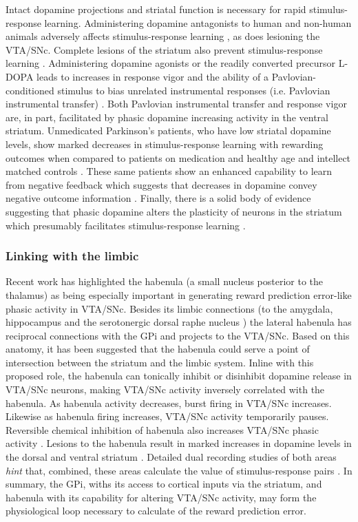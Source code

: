 \documentclass[doc,12pt]{apa}        %
\begin{document}
Intact dopamine projections and striatal function is necessary for rapid stimulus-response learning.  Administering dopamine antagonists to human and non-human animals adversely affects stimulus-response learning \cite{Pizzagalli:2010p7205}, as does lesioning the VTA/SNc.  Complete lesions of the striatum also prevent stimulus-response learning \cite{Packard:2002p5074}.  Administering dopamine agonists or the readily converted precursor L-DOPA leads to increases in response vigor and the ability of a Pavlovian-conditioned stimulus to bias unrelated instrumental responses (i.e. Pavlovian instrumental transfer) \cite{Winterbauer:2007p6352}. Both Pavlovian instrumental transfer and response vigor are, in part, facilitated by phasic dopamine increasing activity in the ventral striatum.  Unmedicated Parkinson's patients, who have low striatal dopamine levels, show marked decreases in stimulus-response learning with rewarding outcomes when compared to patients on medication and healthy age and intellect matched controls \cite{Pizzagalli:2010p7205}.  These same patients show an enhanced capability to learn from negative feedback which suggests that decreases in dopamine convey negative outcome information \cite{Frank:2004p4709}.  Finally, there is a solid body of evidence suggesting that phasic dopamine alters the plasticity of neurons in the striatum which presumably facilitates stimulus-response learning \cite{Calabresi:2007p4284}.

\subsubsection{Linking with the limbic}
\label{subsub:limbic}
Recent work has highlighted the habenula (a small nucleus posterior to the thalamus) as being especially important in generating reward prediction error-like phasic activity in VTA/SNc.  Besides its limbic connections (to the amygdala, hippocampus and the serotonergic dorsal raphe nucleus \cite{Hikosaka:2008p4455}) the lateral habenula has reciprocal connections with the GPi and projects to the VTA/SNc.  Based on this anatomy, it has been suggested that the habenula could serve a point of intersection between the striatum and the limbic system.  Inline with this proposed role, the habenula can tonically inhibit or disinhibit dopamine release in VTA/SNc neurons, making VTA/SNc activity inversely correlated with the habenula.  As habenula activity decreases, burst firing in VTA/SNc increases.  Likewise as habenula firing increases, VTA/SNc activity temporarily pauses.  Reversible chemical inhibition of habenula also increases VTA/SNc phasic activity \cite{Hikosaka:2008p4455}.  Lesions to the habenula result in marked increases in dopamine levels in the dorsal and ventral striatum \cite{BrombergMartin:2010p7221}.  Detailed dual recording studies of both areas \emph{hint} that, combined, these areas calculate the value of stimulus-response pairs \cite{BrombergMartin:2010p7221}.  In summary, the GPi, withs its access to cortical inputs via the striatum, and habenula with its capability for altering VTA/SNc activity, may form the physiological loop necessary to calculate of the reward prediction error.
\end{document}
